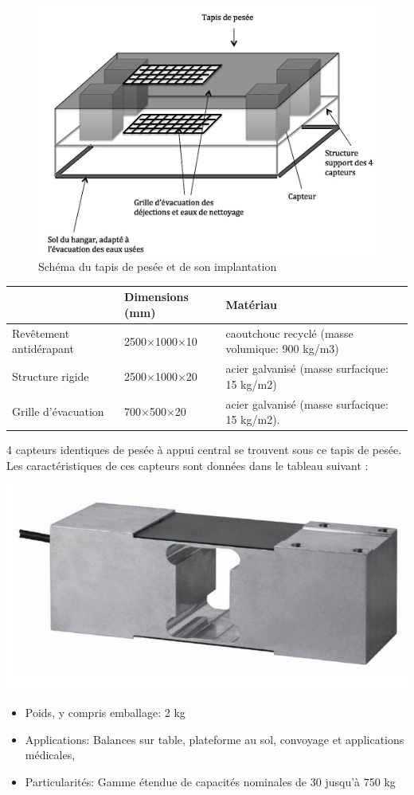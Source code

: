 \begin{figure}[ht!]
\begin{center}
 \includegraphics[width=0.6\linewidth]{img/fig005}
\end{center}
\label{fig005}
\caption{Schéma du tapis de pesée et de son implantation}
\end{figure}

\begin{tabular}{|l|l|l|}
\hline
& Dimensions (mm)& Matériau\\
\hline
Revêtement antidérapant & 2500×1000×10 & caoutchouc recyclé (masse volumique: 900 kg/m3) \\
\hline
Structure rigide & 2500×1000×20 & acier galvanisé (masse surfacique: 15 kg/m2)\\
\hline
Grille d’évacuation & 700×500×20 & acier galvanisé (masse surfacique: 15 kg/m2).\\
\hline
\end{tabular}

4 capteurs identiques de pesée à appui central se trouvent sous ce tapis de pesée. Les caractéristiques de ces capteurs sont données dans le tableau suivant :


\begin{minipage}{0.4\linewidth}
\includegraphics[width=0.9\linewidth]{img/tab001}
\end{minipage}
\begin{minipage}{0.55\linewidth}
\begin{itemize}
 \item Poids, y compris emballage: 2 kg
 \item Applications: Balances sur table, plateforme au sol, convoyage et applications médicales,
 \item Particularités: Gamme étendue de capacités nominales de 30 jusqu’à 750 kg
\end{itemize}
\end{minipage}

